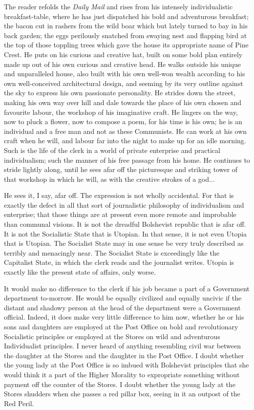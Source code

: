\documentclass{book}
\begin{document}
The reader refolds the \emph{Daily Mail} and rises from his intensely individualistic breakfast-table, where he has just dispatched his bold and adventurous breakfast; the bacon cut in rashers from the wild boar which but lately turned to bay in his back garden; the eggs perilously snatched from swaying nest and flapping bird at the top of those toppling trees which gave the house its appropriate name of Pine Crest. He puts on his curious and creative hat, built on some bold plan entirely made up out of his own curious and creative head. He walks outside his unique and unparalleled house, also built with his own well-won wealth according to his own well-conceived architectural design, and seeming by its very outline against the sky to express his own passionate personality. He strides down the street, making his own way over hill and dale towards the place of his own chosen and favourite labour, the workshop of his imaginative craft. He lingers on the way, now to pluck a flower, now to compose a poem, for his time is his own; he is an individual and a free man and not as these Communists. He can work at his own craft when he will, and labour far into the night to make up for an idle morning. Such is the life of the clerk in a world of private enterprise and practical individualism; such the manner of his free passage from his home. He continues to stride lightly along, until he sees afar off the picturesque and striking tower of that workshop in which he will, as with the creative strokes of a god...

He sees it, I say, afar off. The expression is not wholly accidental. For that is exactly the defect in all that sort of journalistic philosophy of individualism and enterprise; that those things are at present even more remote and improbable than communal visions. It is not the dreadful Bolshevist republic that is afar off. It is not the Socialistic State that is Utopian. In that sense, it is not even Utopia that is Utopian. The Socialist State may in one sense be very truly described as terribly and menacingly near. The Socialist State is exceedingly like the Capitalist State, in which the clerk reads and the journalist writes. Utopia is exactly like the present state of affairs, only worse.

It would make no difference to the clerk if his job became a part of a Government department to-morrow. He would be equally civilized and equally uncivic if the distant and shadowy person at the head of the department were a Government official. Indeed, it does make very little difference to him now, whether he or his sons and daughters are employed at the Post Office on bold and revolutionary Socialistic principles or employed at the Stores on wild and adventurous Individualist principles. I never heard of anything resembling civil war between the daughter at the Stores and the daughter in the Post Office. I doubt whether the young lady at the Post Office is so imbued with Bolshevist principles that she would think it a part of the Higher Morality to expropriate something without payment off the counter of the Stores. I doubt whether the young lady at the Stores shudders when she passes a red pillar box, seeing in it an outpost of the Red Peril.
\end{document}

